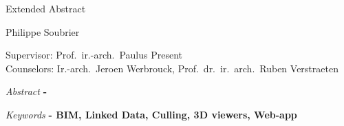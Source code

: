 \begin{center}
    \sffamily
    \huge Extended Abstract

    \Large Philippe Soubrier

    \normalsize
    Supervisor: Prof.\ ir.-arch.\ Paulus Present\\
    Counselors: Ir.-arch.\ Jeroen Werbrouck, Prof.\ dr.\ ir.\ arch.\ Ruben Verstraeten
\end{center}
\begin{multicols}{2}
    \small
    \emph{Abstract} \textbf{
        - \lipsum[1]
    }

    \emph{Keywords} \textbf{
        - BIM, Linked Data, Culling, 3D viewers, Web-app
    }
    
    \lipsum[1-9]

\end{multicols}
\restoregeometry